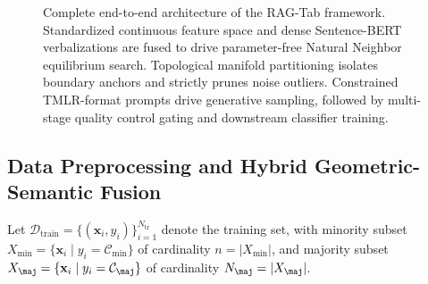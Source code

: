\documentclass[sn-basic]{sn-jnl}
\begin{document}
\begin{figure}[t]
{
}
\caption{Complete end-to-end architecture of the RAG-Tab framework. Standardized continuous feature space and dense Sentence-BERT verbalizations are fused to drive parameter-free Natural Neighbor equilibrium search. Topological manifold partitioning isolates boundary anchors and strictly prunes noise outliers. Constrained TMLR-format prompts drive generative sampling, followed by multi-stage quality control gating and downstream classifier training.}
\label{fig:workflow_diagram}
\end{figure}

\subsection{Data Preprocessing and Hybrid Geometric-Semantic Fusion}
\label{subsec:hybrid_fusion}
Let $\mathcal{D}_{\text{train}} = \{(\mathbf{x}_i, y_i)\}_{i=1}^{N_{\text{tr}}}$ denote the training set, with minority subset $X_{\min} = \{\mathbf{x}_i \mid y_i = \mathcal{C}_{\min}\}$ of cardinality $n = |X_{\min}|$, and majority subset $X_{\maj} = \{\mathbf{x}_i \mid y_i = \mathcal{C}_{\maj}\}$ of cardinality $N_{\maj} = |X_{\maj}|$.
\end{document}
